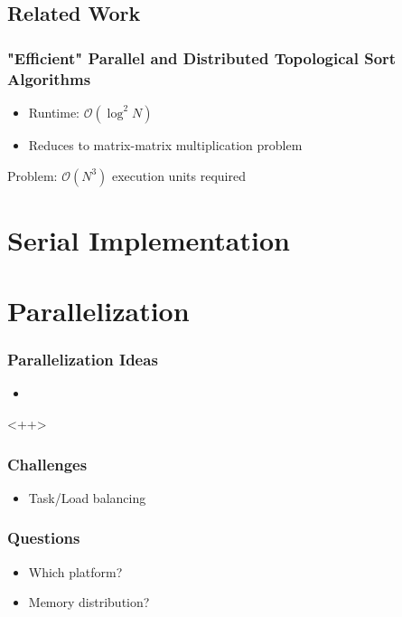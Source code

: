 \subsection{Related Work}

\begin{frame}
\frametitle{"Efficient" Parallel and Distributed Topological Sort Algorithms}

\begin{itemize}
	\item Runtime: $\mathcal{O} (\log^2 N)$
	\item Reduces to matrix-matrix multiplication problem
\end{itemize}

\begin{block}{Problem:}
	$\mathcal{O} (N^3)$ execution units required
\end{block}


\end{frame}




\section{Serial Implementation}

\begin{frame}
\end{frame}


\section{Parallelization}
\begin{frame}

\frametitle{Parallelization Ideas}
\begin{itemize}
	\item 
\end{itemize}<++>
\end{frame}

\begin{frame}
\frametitle{Challenges}
\begin{itemize}
	\item Task/Load balancing
\end{itemize}
\end{frame}


\begin{frame}
\frametitle{Questions}
\begin{itemize}
	\item Which platform?
	\item Memory distribution?
\end{itemize}
\end{frame}


 
